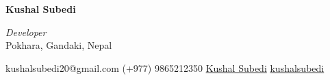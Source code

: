 \documentclass[a4paper,11pt]{article}
\begin{document}
\begin{center}
    \Huge\textbf{Kushal Subedi}
    
    \vspace{0.2cm}
    
    \textit{Developer}\\
    \vspace{0.2 cm}
   \small { Pokhara, Gandaki, Nepal} 
    \noindent\makebox[\linewidth]{\rule{\textwidth}{0.4pt}}
    
    \vspace{0.2cm}
    
    \small
    \faEnvelope\hspace{0.2cm} kushalsubedi20@gmail.com \hspace{0.3cm} \faPhone\hspace{0.2cm} (+977) 9865212350 \hspace{0.2cm}
    \faLinkedin\hspace{0.2cm} \href{https://www.linkedin.com/in/kushal-subedi-3a4a96223/}{Kushal Subedi} \hspace{0.2cm}\faGithub\hspace{0.2cm}\href{https://github.com/kushalsubedi}{kushalsubedi}
\end{center} 
\vspace{0.5cm}
\end{document}
